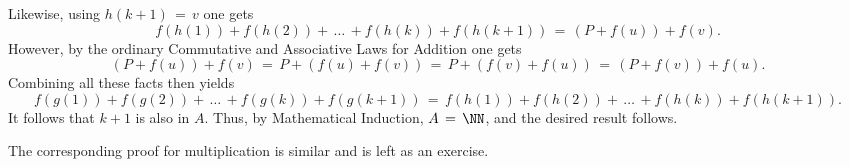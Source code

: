 {\begin{displaymath}
        \end{displaymath}
    Likewise, using $h(k+1) \,=\, v$ one gets
        \begin{displaymath}
        f(h(1)) + f(h(2)) + \,{\ldots}\, + f(h(k)) + f(h(k+1)) \,=\, (P+f(u)) + f(v).
        \end{displaymath}
    However, by the ordinary Commutative and Associative Laws for Addition one gets
        \begin{displaymath}
        (P+f(u)) + f(v) \,=\, P+(f(u) + f(v)) \,=\, P+ (f(v)+f(u)) \,=\, (P+f(v)) + f(u).
        \end{displaymath}
    Combining all these facts then yields
        \begin{displaymath}
        f(g(1)) + f(g(2)) + \,{\ldots}\, + f(g(k)) + f(g(k+1)) \,=\, 
        f(h(1)) + f(h(2)) + \,{\ldots}\, + f(h(k)) + f(h(k+1)).
        \end{displaymath}
    It follows that $k+1$ is also in $A$. Thus, by Mathematical Induction, $A \,=\, {\NN}$, and the desired result follows.

\V

        The corresponding proof for multiplication is similar and is left as an exercise.
}%
